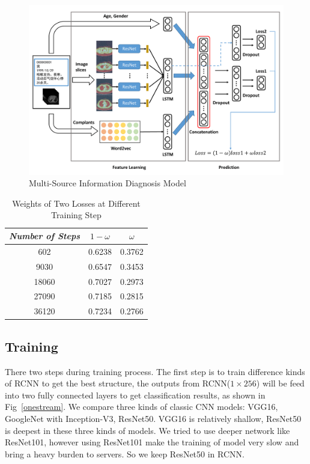 \documentclass[runningheads]{llncs}
\begin{document}
\begin{figure}[htb]
    \centerline{\includegraphics[width=130mm]{MSID.pdf}}
    \vspace{-0cm}
    \caption{Multi-Source Information Diagnosis Model}
    \vspace{-0cm}
    \label{msid}
    \end{figure}

\begin{table}[htb]
    \vspace{-0cm}
    \caption{Weights of Two Losses at Different Training Step}
    \vspace{-0cm}
    \begin{center}
    \begin{tabular}{|c|c|c|}
    \hline
    \textbf{\textit{Number of Steps}} & \textbf{\textit{$1 - \omega$}} & \textbf{\textit{$\omega$}}\\
    \hline
    602 &0.6238 & 0.3762  \\
    9030 &0.6547 & 0.3453  \\
    18060 &0.7027 & 0.2973  \\
    27090 &0.7185 & 0.2815  \\
    36120 &0.7234 & 0.2766  \\

    \hline
    \end{tabular}
    \vspace{-0cm}
    \label{weights}
    \end{center}
    \vspace{-0cm}
    \end{table}

\subsection{Training}
\label{training}
There two steps during training process.
The first step is to train difference kinds of RCNN to get the best structure, the outputs from RCNN($1 \times 256$) will be feed into two fully connected layers to get classification results, as shown in Fig~\ref{onestream}. We compare three kinds of classic CNN models: VGG16, GoogleNet with Inception-V3, ResNet50. VGG16 is relatively shallow, ResNet50 is deepest in these three kinds of models. We tried to use deeper network like ResNet101, however using ResNet101 make the training of model very slow and bring a heavy burden to servers. So we keep ResNet50 in RCNN.
\end{document}

